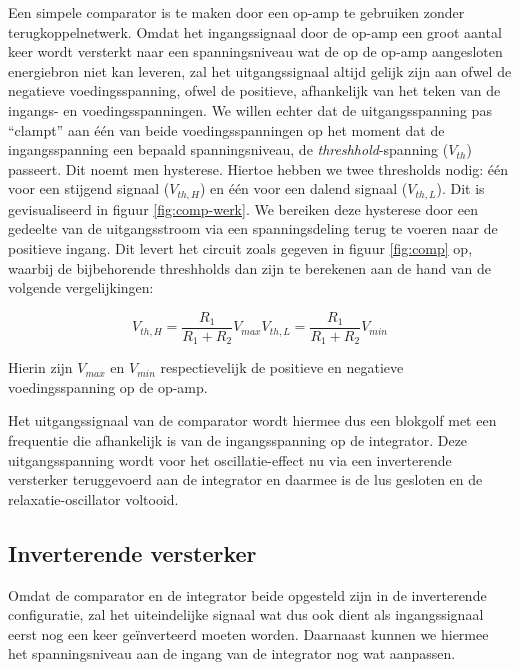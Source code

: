 \documentclass{report}
\begin{document}
Een simpele comparator is te maken door een op-amp te gebruiken zonder terugkoppelnetwerk. Omdat het ingangssignaal door de op-amp een groot aantal keer wordt versterkt naar een spanningsniveau wat de op de op-amp aangesloten energiebron niet kan leveren, zal het uitgangssignaal altijd gelijk zijn aan ofwel de negatieve voedingsspanning, ofwel de positieve, afhankelijk van het teken van de ingangs- en voedingsspanningen. We willen echter dat de uitgangsspanning pas ``clampt'' aan één van beide voedingsspanningen op het moment dat de ingangsspanning een bepaald spanningsniveau, de \textit{threshhold}-spanning ($V_{th}$) passeert. Dit noemt men hysterese. Hiertoe hebben we twee thresholds nodig: één voor een stijgend signaal ($V_{th,H}$) en één voor een dalend signaal ($V_{th,L}$). Dit is gevisualiseerd in figuur \ref{fig:comp-werk}. We bereiken deze hysterese door een gedeelte van de uitgangsstroom via een spanningsdeling terug te voeren naar de positieve ingang. Dit levert het circuit zoals gegeven in figuur \ref{fig:comp} op, waarbij de bijbehorende threshholds dan zijn te berekenen aan de hand van de volgende vergelijkingen:

\begin{subequations}
	\begin{equation}
		V_{th,H} = \frac{R_{1}}{R_{1}+R_{2}}V_{max}
		\label{eq:comp-H}
	\end{equation}

	\begin{equation}
		V_{th,L} = \frac{R_{1}}{R_{1}+R_{2}}V_{min}
		\label{eq:comp-L}
	\end{equation}
	\label{eq:comp}
\end{subequations}

\noindent
Hierin zijn $V_{max}$ en $V_{min}$ respectievelijk de positieve en negatieve voedingsspanning op de op-amp.

Het uitgangssignaal van de comparator wordt hiermee dus een blokgolf met een frequentie die afhankelijk is van de ingangsspanning op de integrator. Deze uitgangsspanning wordt voor het oscillatie-effect nu via een inverterende versterker teruggevoerd aan de integrator en daarmee is de lus gesloten en de relaxatie-oscillator voltooid.

\subsection{Inverterende versterker}
Omdat de comparator en de integrator beide opgesteld zijn in de inverterende configuratie, zal het uiteindelijke signaal wat dus ook dient als ingangssignaal eerst nog een keer geïnverteerd moeten worden. Daarnaast kunnen we hiermee het spanningsniveau aan de ingang van de integrator nog wat aanpassen. 
\end{document}
